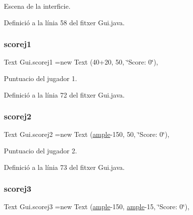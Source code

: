 Escena de la interficie. 



Definició a la línia 58 del fitxer Gui.\+java.

\mbox{\label{class_gui_af2f35c2a3421b4d76fc232f854903312}} 
\subsubsection{\texorpdfstring{scorej1}{scorej1}}
{\footnotesize\ttfamily Text Gui.\+scorej1 =new Text (40+20, 50, \char`\"{}Score\+: 0\char`\"{})\hspace{0.3cm}{\ttfamily [static]}, {\ttfamily [private]}}



Puntuacio del jugador 1. 



Definició a la línia 72 del fitxer Gui.\+java.

\mbox{\label{class_gui_a2bb8d906be16f4e53c1aa393c1750608}} 
\subsubsection{\texorpdfstring{scorej2}{scorej2}}
{\footnotesize\ttfamily Text Gui.\+scorej2 =new Text (\mbox{\hyperlink{class_gui_a872c30141e879159a1c3d9958918fecd}{ample}}-\/150, 50, \char`\"{}Score\+: 0\char`\"{})\hspace{0.3cm}{\ttfamily [static]}, {\ttfamily [private]}}



Puntuacio del jugador 2. 



Definició a la línia 73 del fitxer Gui.\+java.

\mbox{\label{class_gui_a691917c172b8ab9888a4fbe6075c8c54}} 
\subsubsection{\texorpdfstring{scorej3}{scorej3}}
{\footnotesize\ttfamily Text Gui.\+scorej3 =new Text (\mbox{\hyperlink{class_gui_a872c30141e879159a1c3d9958918fecd}{ample}}-\/150, \mbox{\hyperlink{class_gui_a872c30141e879159a1c3d9958918fecd}{ample}}-\/15, \char`\"{}Score\+: 0\char`\"{})\hspace{0.3cm}{\ttfamily [static]}, {\ttfamily [private]}}



